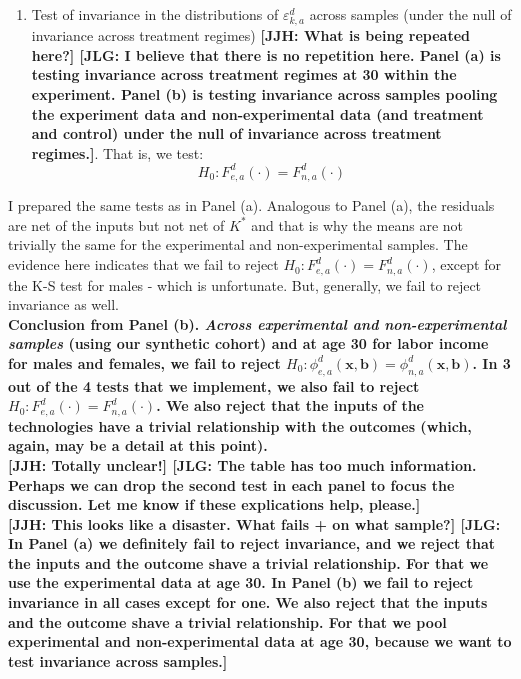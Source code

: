 \begin{enumerate}
\item Test of invariance in the distributions of $\varepsilon_{k,a}^d$ across samples (under the null of invariance across treatment regimes) \textbf{[JJH: What is being repeated here?] [JLG: I believe that there is no repetition here. Panel (a) is testing invariance across treatment regimes at 30 within the experiment. Panel (b) is testing invariance across samples pooling the experiment data and non-experimental data (and treatment and control) under the null of invariance across treatment regimes.]}. That is, we test:
	\begin{equation} 
	H_0: F_{e,a}^d \left( \cdot \right) = F_{n,a}^d \left( \cdot \right)
	\end{equation}
\end{enumerate}

\noindent I prepared the same tests as in Panel (a). Analogous to Panel (a), the residuals are net of the inputs but not net of $K^*$ and that is why the means are not trivially the same for the experimental and non-experimental samples. The evidence here indicates that we fail to reject $H_0: F_{e,a}^d \left( \cdot \right) = F_{n,a}^d \left( \cdot \right)$, except for the K-S test for males - which is unfortunate. But, generally, we fail to reject invariance as well.\\

\noindent \textbf{Conclusion from Panel (b). \textit{Across experimental and non-experimental samples} (using our synthetic cohort) and at age 30 for labor income for males and females, we fail to reject $H_0: \phi_{e,a}^d \left( \bm{x}, \bm{b} \right) = \phi_{n,a}^d \left( \bm{x}, \bm{b} \right)$. In 3 out of the 4 tests that we implement, we also fail to reject $H_0: F_{e,a}^d \left( \cdot \right) = F_{n,a}^d \left( \cdot \right)$. We also reject that the inputs of the technologies have a trivial relationship with the outcomes (which, again, may be a detail at this point).}\\ 

\noindent \textbf{[JJH: Totally unclear!] [JLG: The table has too much information. Perhaps we can drop the second test in each panel to focus the discussion. Let me know if these explications help, please.]}\\

\noindent \textbf{[JJH: This looks like a disaster. What fails + on what sample?] [JLG: In Panel (a) we definitely fail to reject invariance, and we reject that the inputs and the outcome shave a trivial relationship. For that we use the experimental data at age 30. In Panel (b) we fail to reject invariance in all cases except for one. We also reject that the inputs and the outcome shave a trivial relationship. For that we pool experimental and non-experimental data at age 30, because we want to test invariance across samples.]}\\

